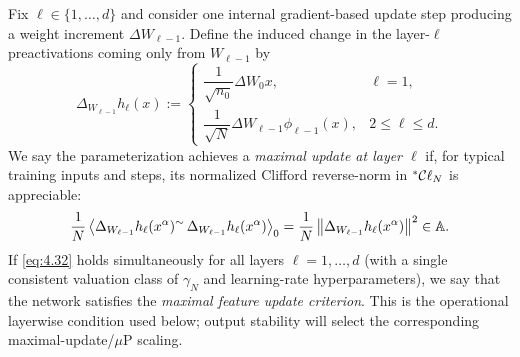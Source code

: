 \begin{definition}\label{def:4.6}
Fix $\ell \in \{1, \dots, d\}$ and consider one internal gradient-based update step producing a weight increment $\Delta W_{\ell-1}$. Define the induced change in the layer-$\ell$ preactivations coming only from $W_{\ell-1}$ by
\begin{equation}\label{eq:4.31}
\Delta_{W_{\ell-1}} h_\ell(x) :=
\begin{cases}
\dfrac{1}{\sqrt{n_0}} \Delta W_0 x, & \ell = 1, \\[0.7em]
\dfrac{1}{\sqrt{N}} \Delta W_{\ell-1} \phi_{\ell-1}(x), & 2 \le \ell \le d.
\end{cases}
\end{equation}
We say the parameterization achieves a \emph{maximal update at layer $\ell$} if, for typical training inputs and steps, its normalized Clifford reverse-norm in ${}^*\mathcal{C}\ell_N$ is appreciable:
\begin{equation}\label{eq:4.32}
\frac{1}{N}\left\langle \Delta_{W_{\ell-1}} h_\ell(x^\alpha)^{\sim}\,\Delta_{W_{\ell-1}} h_\ell(x^\alpha) \right\rangle_0 = \frac{1}{N}\left\lVert \Delta_{W_{\ell-1}} h_\ell(x^\alpha) \right\rVert^2 \in \mathbb{A}.
\end{equation}
If \eqref{eq:4.32} holds simultaneously for all layers $\ell = 1, \dots, d$ (with a single consistent valuation class of $\gamma_N$ and learning-rate hyperparameters), we say that the network satisfies the \emph{maximal feature update criterion}. This is the operational layerwise condition used below; output stability will select the corresponding maximal-update/$\mu$P scaling.
\end{definition}

